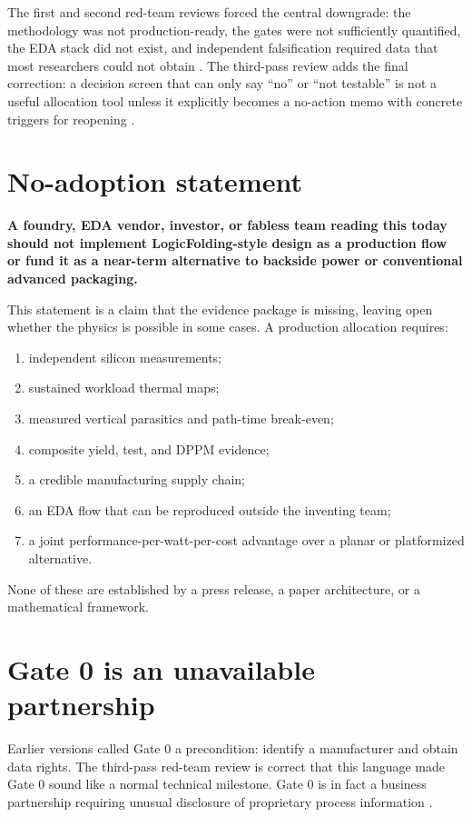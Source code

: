 \documentclass[11pt]{article}
\begin{document}
The first and second red-team reviews forced the central downgrade: the methodology was not production-ready, the gates were not sufficiently quantified, the EDA stack did not exist, and independent falsification required data that most researchers could not obtain \cite{UserRedTeam1,UserRedTeam2}. The third-pass review adds the final correction: a decision screen that can only say ``no'' or ``not testable'' is not a useful allocation tool unless it explicitly becomes a no-action memo with concrete triggers for reopening \cite{UserRedTeam3}.

\section{No-adoption statement}
\textbf{A foundry, EDA vendor, investor, or fabless team reading this today should not implement LogicFolding-style design as a production flow or fund it as a near-term alternative to backside power or conventional advanced packaging.}

This statement is a claim that the evidence package is missing, leaving open whether the physics is possible in some cases. A production allocation requires:
\begin{enumerate}
  \item independent silicon measurements;
  \item sustained workload thermal maps;
  \item measured vertical parasitics and path-time break-even;
  \item composite yield, test, and DPPM evidence;
  \item a credible manufacturing supply chain;
  \item an EDA flow that can be reproduced outside the inventing team;
  \item a joint performance-per-watt-per-cost advantage over a planar or platformized alternative.
\end{enumerate}

None of these are established by a press release, a paper architecture, or a mathematical framework.

\section{Gate 0 is an unavailable partnership}
Earlier versions called Gate 0 a precondition: identify a manufacturer and obtain data rights. The third-pass red-team review is correct that this language made Gate 0 sound like a normal technical milestone. Gate 0 is in fact a business partnership requiring unusual disclosure of proprietary process information \cite{UserRedTeam3}.
\end{document}
